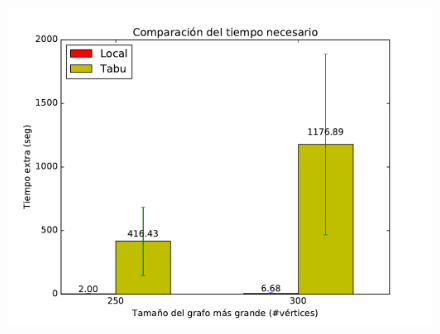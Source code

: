 \begin{figure}[H]
\begin{minipage}{0.49\textwidth}
  \centering
    \includegraphics[width=1\textwidth]{graficos/problema_7/tiempo4.pdf}
  \caption{}
  \label{fig:7-tiempo3}
\end{minipage}%
\end{figure}

